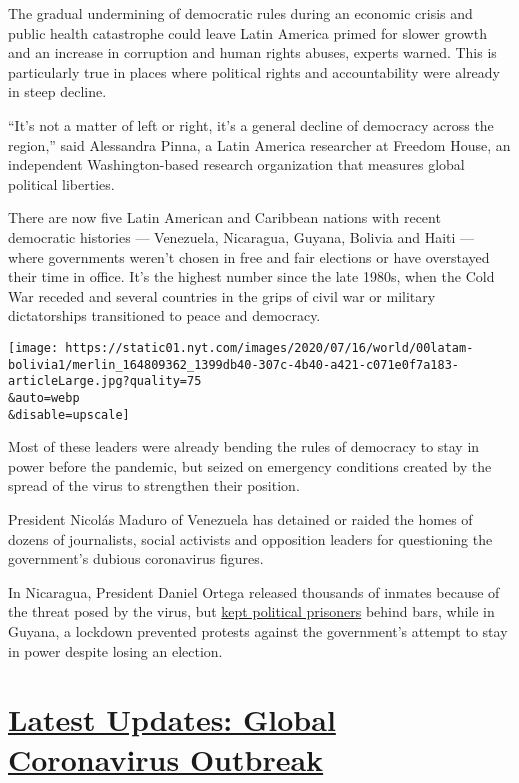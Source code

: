 The gradual undermining of democratic rules during an economic crisis
and public health catastrophe could leave Latin America primed for
slower growth and an increase in corruption and human rights abuses,
experts warned. This is particularly true in places where political
rights and accountability were already in steep decline.

``It's not a matter of left or right, it's a general decline of
democracy across the region,'' said Alessandra Pinna, a Latin America
researcher at Freedom House, an independent Washington-based research
organization that measures global political liberties.

There are now five Latin American and Caribbean nations with recent
democratic histories --- Venezuela, Nicaragua, Guyana, Bolivia and Haiti
--- where governments weren't chosen in free and fair elections or have
overstayed their time in office. It's the highest number since the late
1980s, when the Cold War receded and several countries in the grips of
civil war or military dictatorships transitioned to peace and democracy.

\texttt{[image: https://static01.nyt.com/images/2020/07/16/world/00latam-bolivia1/merlin\_164809362\_1399db40-307c-4b40-a421-c071e0f7a183-articleLarge.jpg?quality=75\\\&auto=webp\\\&disable=upscale]}

Most of these leaders were already bending the rules of democracy to
stay in power before the pandemic, but seized on emergency conditions
created by the spread of the virus to strengthen their position.

President Nicolás Maduro of Venezuela has detained or raided the homes
of dozens of journalists, social activists and opposition leaders for
questioning the government's dubious coronavirus figures.

In Nicaragua, President Daniel Ortega released thousands of inmates
because of the threat posed by the virus, but
\href{https://www.barrons.com/news/nicaragua-excludes-political-prisoners-from-mass-release-01586430304}{kept
political prisoners} behind bars, while in Guyana, a lockdown prevented
protests against the government's attempt to stay in power despite
losing an election.

\hypertarget{latest-updates-global-coronavirus-outbreak}{%
\section{\texorpdfstring{\href{https://www.nytimes.com/2020/08/01/world/coronavirus-covid-19.html?action=click\&pgtype=Article\&state=default\&region=MAIN_CONTENT_1\&context=storylines_live_updates}{Latest
Updates: Global Coronavirus
Outbreak}}{Latest Updates: Global Coronavirus Outbreak}}\label{latest-updates-global-coronavirus-outbreak}}

